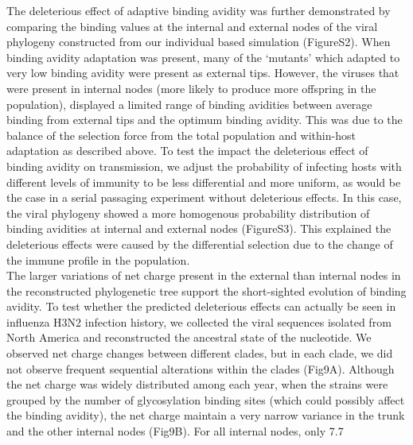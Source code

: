\documentclass[12pt,a4paper]{article}
\begin{document}
The deleterious effect of adaptive binding avidity was further demonstrated by comparing the binding values at the internal and external nodes of the viral phylogeny constructed from our individual based simulation (FigureS2). When binding avidity adaptation was present, many of  the ‘mutants’ which adapted to very low binding avidity were present as external tips. However, the viruses that were present in internal nodes (more likely to produce more offspring in the population), displayed a limited range of binding avidities between average binding from external tips and the optimum binding avidity. This was due to the balance of the selection force from the total population and within-host adaptation as described above. To test the impact the deleterious effect of binding avidity on transmission, we adjust the probability of infecting hosts with different levels of immunity to be less differential and more uniform, as would be the case in a serial passaging experiment without deleterious effects. In this case, the viral phylogeny showed a more homogenous probability distribution of binding avidities at internal and external nodes (FigureS3). This explained the deleterious effects were caused by the differential selection due to the change of the immune profile in the population. \\
The larger variations of net charge present in the external than internal nodes in the reconstructed phylogenetic tree support the short-sighted evolution of binding avidity. To test whether the predicted deleterious effects can actually be seen in influenza H3N2 infection history, we collected the viral sequences isolated from North America and reconstructed the ancestral state of the nucleotide. We observed net charge changes between different clades, but in each clade, we did not observe frequent sequential alterations within the clades (Fig9A). Although the net charge was widely distributed among each year, when the strains were grouped by the number of glycosylation binding sites (which could possibly affect the binding avidity), the net charge maintain a very narrow variance in the trunk and the other internal nodes (Fig9B). For all internal nodes, only 7.7%
\end{document}
